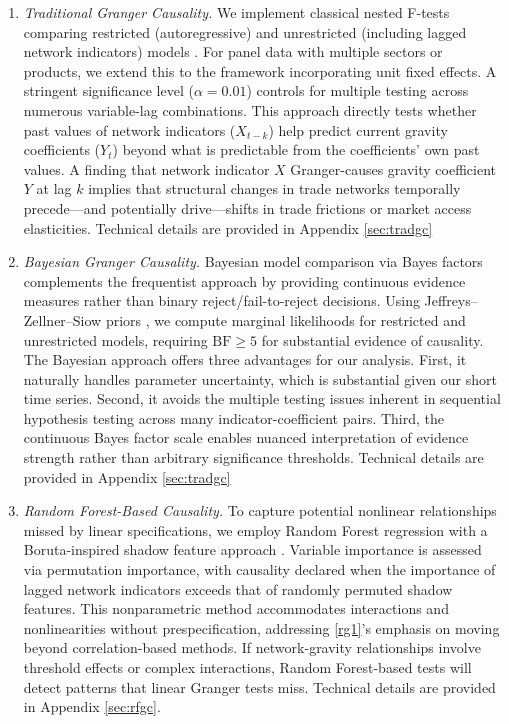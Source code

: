 \documentclass[preprint, 3p,
authoryear]{elsarticle} %
\begin{document}
\begin{enumerate}
  \item \textit{Traditional Granger Causality.} We implement classical nested F-tests comparing restricted (autoregressive) and unrestricted (including lagged network indicators) models \citep{granger1969}. For panel data with multiple sectors or products, we extend this to the \citet{dumitrescu2012} framework incorporating unit fixed effects. A stringent significance level ($\alpha = 0.01$) controls for multiple testing across numerous variable-lag combinations. This approach directly tests whether past values of network indicators ($X_{t-k}$) help predict current gravity coefficients ($Y_t$) beyond what is predictable from the coefficients' own past values. A finding that network indicator $X$ Granger-causes gravity coefficient $Y$ at lag $k$ implies that structural changes in trade networks temporally precede---and potentially drive---shifts in trade frictions or market access elasticities. Technical details are provided in Appendix \ref{sec:tradgc}
  \item \textit{Bayesian Granger Causality.}
   Bayesian model comparison via Bayes factors \citep{kass1995} complements the frequentist approach by providing continuous evidence measures rather than binary reject/fail-to-reject decisions. Using Jeffreys--Zellner--Siow priors \citep{liang2008}, we compute marginal likelihoods for restricted and unrestricted models, requiring $\text{BF} \geq 5$ for substantial evidence of causality. The Bayesian approach offers three advantages for our analysis. First, it naturally handles parameter uncertainty, which is substantial given our short time series. Second, it avoids the multiple testing issues inherent in sequential hypothesis testing across many indicator-coefficient pairs. Third, the continuous Bayes factor scale enables nuanced interpretation of evidence strength rather than arbitrary significance thresholds. Technical details are provided in Appendix \ref{sec:tradgc}
  \item \textit{Random Forest-Based Causality.}  To capture potential nonlinear relationships missed by linear specifications, we employ Random Forest regression with a Boruta-inspired shadow feature approach \citep{breiman2001, kursa2010}. Variable importance is assessed via permutation importance, with causality declared when the importance of lagged network indicators exceeds that of randomly permuted shadow features. This nonparametric method accommodates interactions and nonlinearities without prespecification, addressing \ref{rg1}'s emphasis on moving beyond correlation-based methods. If network-gravity relationships involve threshold effects or complex interactions, Random Forest-based tests will detect patterns that linear Granger tests miss. Technical details are provided in Appendix \ref{sec:rfgc}.
\end{enumerate}
\end{document}

